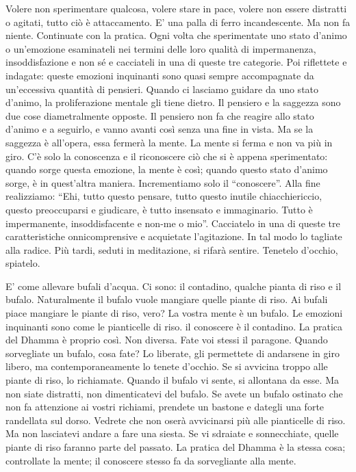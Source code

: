 Volere non sperimentare qualcosa, volere stare in pace, volere non
essere distratti o agitati, tutto ciò è attaccamento. E' una palla di
ferro incandescente. Ma non fa niente. Continuate con la pratica. Ogni
volta che sperimentate uno stato d'animo o un'emozione esaminateli nei
termini delle loro qualità di impermanenza, insoddisfazione e non sé e
cacciateli in una di queste tre categorie. Poi riflettete e indagate:
queste emozioni inquinanti sono quasi sempre accompagnate da
un'eccessiva quantità di pensieri. Quando ci lasciamo guidare da uno
stato d'animo, la proliferazione mentale gli tiene dietro. Il pensiero e
la saggezza sono due cose diametralmente opposte. Il pensiero non fa che
reagire allo stato d'animo e a seguirlo, e vanno avanti così senza una
fine in vista. Ma se la saggezza è all'opera, essa fermerà la mente. La
mente si ferma e non va più in giro. C'è solo la conoscenza e il
riconoscere ciò che si è appena sperimentato: quando sorge questa
emozione, la mente è così; quando questo stato d'animo sorge, è in
quest'altra maniera. Incrementiamo solo il ``conoscere''. Alla fine
realizziamo: ``Ehi, tutto questo pensare, tutto questo inutile
chiacchiericcio, questo preoccuparsi e giudicare, è tutto insensato e
immaginario. Tutto è impermanente, insoddisfacente e non-me o mio''.
Cacciatelo in una di queste tre caratteristiche onnicomprensive e
acquietate l'agitazione. In tal modo lo tagliate alla radice. Più tardi,
seduti in meditazione, si rifarà sentire. Tenetelo d'occhio, spiatelo.

E' come allevare bufali d'acqua. Ci sono: il contadino, qualche pianta
di riso e il bufalo. Naturalmente il bufalo vuole mangiare quelle piante
di riso. Ai bufali piace mangiare le piante di riso, vero? La vostra
mente è un bufalo. Le emozioni inquinanti sono come le pianticelle di
riso. il conoscere è il contadino. La pratica del Dhamma è proprio così.
Non diversa. Fate voi stessi il paragone. Quando sorvegliate un bufalo,
cosa fate? Lo liberate, gli permettete di andarsene in giro libero, ma
contemporaneamente lo tenete d'occhio. Se si avvicina troppo alle piante
di riso, lo richiamate. Quando il bufalo vi sente, si allontana da esse.
Ma non siate distratti, non dimenticatevi del bufalo. Se avete un bufalo
ostinato che non fa attenzione ai vostri richiami, prendete un bastone e
dategli una forte randellata sul dorso. Vedrete che non oserà
avvicinarsi più alle pianticelle di riso. Ma non lasciatevi andare a
fare una siesta. Se vi sdraiate e sonnecchiate, quelle piante di riso
faranno parte del passato. La pratica del Dhamma è la stessa cosa;
controllate la mente; il conoscere stesso fa da sorvegliante alla mente.

